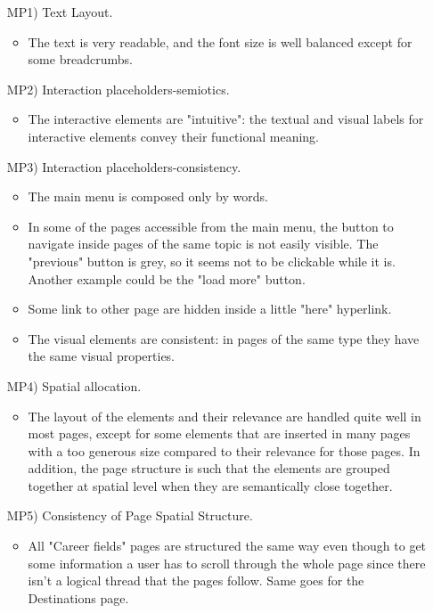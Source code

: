 \documentclass[11pt, letterpaper]{article}
\begin{document}
\begin{enumerate}
\begin{itemize}
            \end{itemize}
        \item[MP1)] Text Layout.
            \begin{itemize}
                \item The text is very readable, and the font size is well balanced except for some breadcrumbs.
            \end{itemize}
        \item[MP2)] Interaction placeholders-semiotics.
            \begin{itemize}
                \item The interactive elements are "intuitive": the textual and visual labels for interactive elements convey their functional meaning.
            \end{itemize}
        \item[MP3)] Interaction placeholders-consistency.
            \begin{itemize}
                \item The main menu is composed only by words.
                \item In some of the pages accessible from the main menu, the button to navigate inside pages of the same topic is not easily visible. The "previous" button is grey, so it seems not to be clickable while it is. Another example could be the "load more" button.
                \item Some link to other page are hidden inside a little "here" hyperlink.
                \item The visual elements are consistent: in pages of the same type they have the same visual properties.
            \end{itemize}
        \item[MP4)] Spatial allocation.
            \begin{itemize}
                \item  The layout of the elements and their relevance are handled quite well in most pages, except for some elements that are inserted in many pages with a too generous size compared to their relevance for those pages. In addition, the page structure is such that the elements are grouped together at spatial level when they are semantically close together.
            \end{itemize}
        \item[MP5)] Consistency of Page Spatial Structure.
            \begin{itemize}
                \item All "Career fields" pages are structured the same way even though to get some information a user has to scroll through the whole page since there isn't a logical thread that the pages follow. Same goes for the Destinations page.

\end{itemize}
\end{enumerate}
\end{document}
